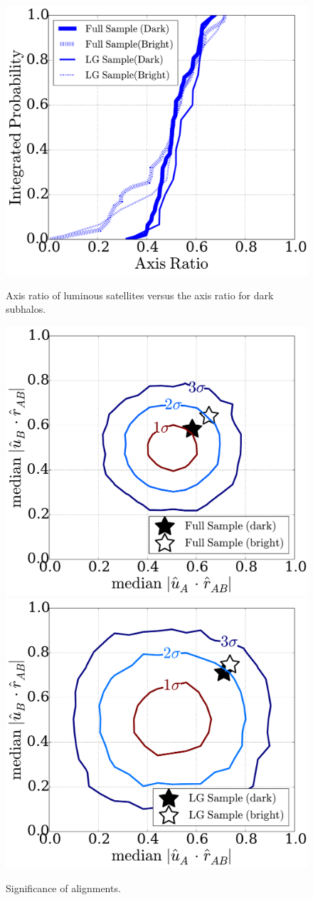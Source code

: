 \documentclass{emulateapj}
\begin{document}
\begin{figure}
\centering
\includegraphics[width=\hsize]{axratio_dark_bright.pdf}\\
\caption{Axis ratio of luminous satellites versus the axis ratio for
  dark subhalos.}
\label{fig:StreamPlaneOrbit}
\end{figure}


\begin{figure}
\centering
\includegraphics[width=0.48\hsize]{significance_full_bright.pdf}
\includegraphics[width=0.48\hsize]{significance_lg_bright.pdf}
\caption{Significance of alignments.}
\label{fig:significance}
\end{figure}
\end{document}
